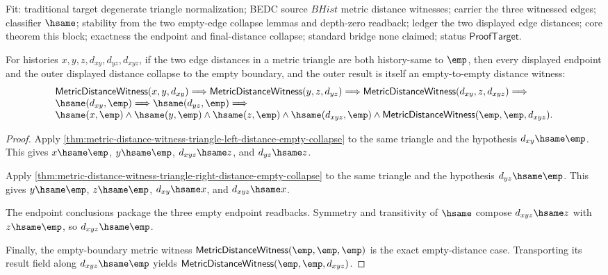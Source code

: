 Fit: traditional target degenerate triangle normalization; BEDC source $BHist$
metric distance witnesses; carrier the three witnessed edges; classifier
$\hsame$; stability from the two empty-edge collapse lemmas and depth-zero
readback; ledger the two displayed edge distances; core theorem this block;
exactness the endpoint and final-distance collapse; standard bridge none
claimed; status $\mathsf{ProofTarget}$.

\begin{theorem}
\label{thm:metric-distance-witness-two-sided-empty-triangle-boundary-package}
For histories $x,y,z,d_{xy},d_{yz},d_{xyz}$, if the two edge distances in a
metric triangle are both history-same to $\emp$, then every displayed endpoint
and the outer displayed distance collapse to the empty boundary, and the outer
result is itself an empty-to-empty distance witness:
$$
\begin{array}{l}
\mathsf{MetricDistanceWitness}(x,y,d_{xy})\Longrightarrow
\mathsf{MetricDistanceWitness}(y,z,d_{yz})\Longrightarrow
\mathsf{MetricDistanceWitness}(d_{xy},z,d_{xyz})\Longrightarrow\\
\hsame(d_{xy},\emp)\Longrightarrow\hsame(d_{yz},\emp)\Longrightarrow\\
\hsame(x,\emp)\land\hsame(y,\emp)\land\hsame(z,\emp)\land
\hsame(d_{xyz},\emp)\land
\mathsf{MetricDistanceWitness}(\emp,\emp,d_{xyz}).
\end{array}
$$
\end{theorem}
\begin{proof}
Apply
\autoref{thm:metric-distance-witness-triangle-left-distance-empty-collapse}
to the same triangle and the hypothesis $d_{xy}\hsame\emp$. This gives
$x\hsame\emp$, $y\hsame\emp$, $d_{xyz}\hsame z$, and $d_{yz}\hsame z$.

Apply
\autoref{thm:metric-distance-witness-triangle-right-distance-empty-collapse}
to the same triangle and the hypothesis $d_{yz}\hsame\emp$. This gives
$y\hsame\emp$, $z\hsame\emp$, $d_{xy}\hsame x$, and $d_{xyz}\hsame x$.

The endpoint conclusions package the three empty endpoint readbacks. Symmetry
and transitivity of $\hsame$ compose $d_{xyz}\hsame z$ with $z\hsame\emp$, so
$d_{xyz}\hsame\emp$.

Finally, the empty-boundary metric witness
$\mathsf{MetricDistanceWitness}(\emp,\emp,\emp)$ is the exact empty-distance
case. Transporting its result field along $d_{xyz}\hsame\emp$ yields
$\mathsf{MetricDistanceWitness}(\emp,\emp,d_{xyz})$.
\end{proof}

